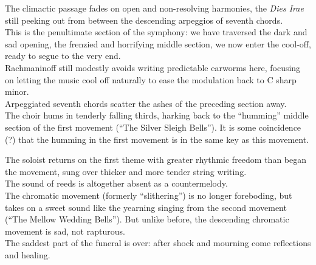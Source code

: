 \documentclass{beamer}
\begin{document}
\begin{frame}
  The climactic passage fades on open and non-resolving harmonies, the \textit{Dies Irae} still peeking out from between the descending arpeggios of seventh chords. 
  \pause \\ 
  This is the penultimate section of the symphony: we have traversed the dark and sad opening, the frenzied and horrifying middle section, we now enter the cool-off, ready to segue to the very end. 
  \pause \\ 
  Rachmaninoff still modestly avoids writing predictable earworms here, focusing on letting the music cool off naturally to ease the modulation back to C sharp minor. 
  \pause \\ 
  Arpeggiated seventh chords scatter the ashes of the preceding section away. 
  \pause \\
  The choir hums in tenderly falling thirds, harking back to the ``humming'' middle section of the first movement (``The Silver Sleigh Bells''). It is some coincidence (?) that the humming in the first movement is in the same key as this movement. 
\end{frame} 

\begin{frame} 
  The soloist returns on the first theme with greater rhythmic freedom than began the movement, sung over thicker and more tender string writing. 
  \pause \\ 
  The sound of reeds is altogether absent as a countermelody. 
  \pause \\ 
  The chromatic movement (formerly ``slithering'') is no longer foreboding, but takes on a sweet sound like the yearning singing from the second movement (``The Mellow Wedding Bells''). But unlike before, the descending chromatic movement is sad, not rapturous. 
  \pause \\ 
  The saddest part of the funeral is over: after shock and mourning come reflections and healing. 
\end{frame} 
\end{document}
